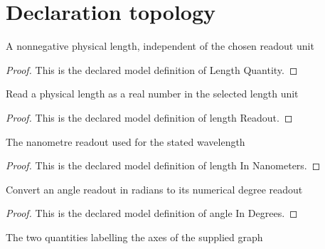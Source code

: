 \section{Declaration topology}
\begin{definition}
  \label{def:physics:phyx-mini-0924:phyxminiproblems-problemphyxmini0924-lengthquantity}
  A nonnegative physical length, independent of the chosen readout unit
\end{definition}
\begin{proof}
  This is the declared model definition of Length Quantity.
\end{proof}
\begin{definition}
  \label{def:physics:phyx-mini-0924:phyxminiproblems-problemphyxmini0924-lengthreadout}
  Read a physical length as a real number in the selected length unit
\end{definition}
\begin{proof}
  This is the declared model definition of length Readout.
\end{proof}
\begin{definition}
  \label{def:physics:phyx-mini-0924:phyxminiproblems-problemphyxmini0924-lengthinnanometers}
  The nanometre readout used for the stated wavelength
\end{definition}
\begin{proof}
  This is the declared model definition of length In Nanometers.
\end{proof}
\begin{definition}
  \label{def:physics:phyx-mini-0924:phyxminiproblems-problemphyxmini0924-angleindegrees}
  Convert an angle readout in radians to its numerical degree readout
\end{definition}
\begin{proof}
  This is the declared model definition of angle In Degrees.
\end{proof}
\begin{definition}
  \label{def:physics:phyx-mini-0924:phyxminiproblems-problemphyxmini0924-figureaxis}
  The two quantities labelling the axes of the supplied graph
\end{definition}
